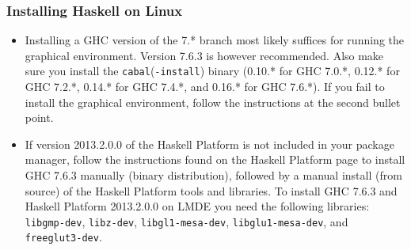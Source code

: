 \documentclass[]{article}
\begin{document}
\subsubsection{Installing Haskell on Linux}
\begin{itemize}
  \item Installing a GHC version of the 7.* branch most likely suffices for running the graphical environment. Version 7.6.3 is however recommended. Also make sure you install the \texttt{cabal}(\texttt{-install}) binary (0.10.* for GHC 7.0.*, 0.12.* for GHC 7.2.*, 0.14.* for GHC 7.4.*, and 0.16.* for GHC 7.6.*). If you fail to install the graphical environment, follow the instructions at the second bullet point.
  \item If version 2013.2.0.0 of the Haskell Platform is not included in your package manager, follow the instructions found on the Haskell Platform page to install GHC 7.6.3 manually (binary distribution), followed by a manual install (from source) of the Haskell Platform tools and libraries.
  To install GHC 7.6.3 and Haskell Platform 2013.2.0.0 on LMDE you need the following libraries: \texttt{libgmp-dev}, \texttt{libz-dev}, \texttt{libgl1-mesa-dev}, \texttt{libglu1-mesa-dev}, and \texttt{freeglut3-dev}.
\end{itemize}
\end{document}
